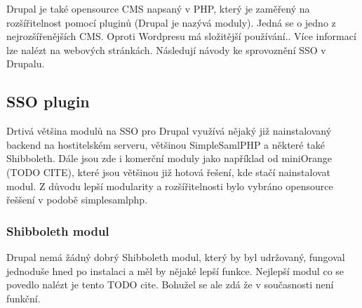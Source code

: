 Drupal je také opensource CMS napsaný v PHP, který je zaměřený na rozšířitelnost pomocí pluginů (Drupal je nazývá moduly). Jedná se o jedno z nejrozšířenějších CMS. Oproti Wordpresu má složitější používání.. Více informací lze nalézt na webových stránkách. %
Následují návody ke sprovoznění SSO v Drupalu.

\subsection{SSO plugin} %
Drtivá většina modulů na SSO pro Drupal využívá nějaký již nainstalovaný backend na hostitelském serveru, většinou SimpleSamlPHP a některé také Shibboleth. Dále jsou zde i komerční moduly jako například od miniOrange (TODO CITE), které jsou většinou již hotová řešení, kde stačí nainstalovat modul. Z důvodu lepší modularity a rozšířitelnosti bylo vybráno opensource řeššení v podobě simplesamlphp.

\subsubsection{Shibboleth modul} %
    Drupal nemá žádný dobrý Shibboleth modul, který by byl udržovaný, fungoval jednoduše hned po instalaci a měl by nějaké lepší funkce. Nejlepší modul co se povedlo nalézt je tento TODO cite. Bohužel se ale zdá že v současnosti není funkční.

